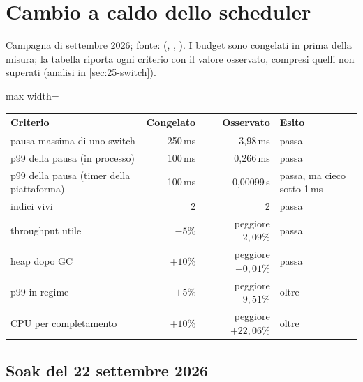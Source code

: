 \section{Cambio a caldo dello scheduler}

Campagna di settembre 2026; fonte: 
(, , ). I budget sono congelati in
 prima della misura; la tabella riporta ogni criterio con il
valore osservato, compresi quelli non superati (analisi in
\cref{sec:25-switch}).

\begin{center}
\small
\begin{adjustbox}{max width=\textwidth}
\begin{tabular}{@{}lrrl@{}}
\toprule
\textbf{Criterio} & \textbf{Congelato} & \textbf{Osservato} & \textbf{Esito} \\
\midrule
pausa massima di uno switch & 250\,ms & 3{,}98\,ms & passa \\
p99 della pausa (in processo) & 100\,ms & 0{,}266\,ms & passa \\
p99 della pausa (timer della piattaforma) & 100\,ms & 0{,}00099\,s & passa,
ma cieco sotto 1\,ms \\
indici vivi & 2 & 2 & passa \\
throughput utile & $-5\%$ & peggiore $+2{,}09\%$ & passa \\
heap dopo GC & $+10\%$ & peggiore $+0{,}01\%$ & passa \\
p99 in regime & $+5\%$ & peggiore $+9{,}51\%$ & oltre \\
CPU per completamento & $+10\%$ & peggiore $+22{,}06\%$ & oltre \\
\bottomrule
\end{tabular}
\end{adjustbox}
\end{center}

\subsection{Soak del 22 settembre 2026}

